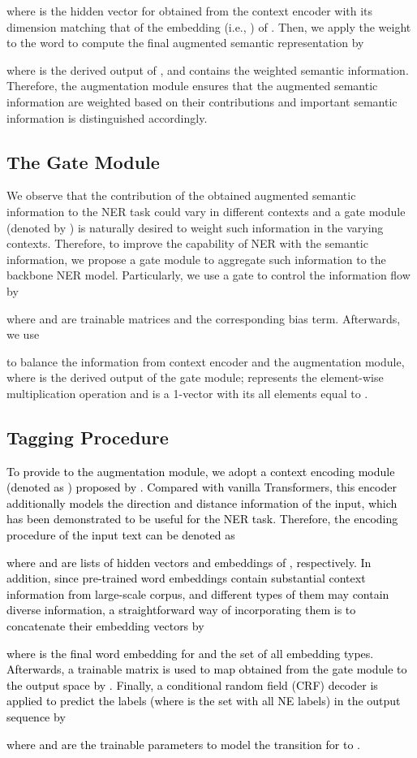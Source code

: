 \documentclass[11pt,a4paper]{article}
\begin{document}
where  is the hidden vector for  obtained from the context encoder with its dimension matching that of the embedding (i.e., ) of . 
Then, we apply the weight  to the word  to compute the final augmented semantic representation by

where  is the derived output of , and contains the weighted semantic information.
Therefore, the augmentation module ensures that the augmented semantic information are weighted based on their contributions and important semantic information is distinguished accordingly.





\subsection{The Gate Module}


We observe that the contribution of the obtained augmented semantic information to the NER task could vary in different contexts and
a gate module (denoted by ) is naturally desired to weight such information in the varying contexts.
Therefore, to improve the capability of NER with the semantic information, we propose a gate module to aggregate such information to the backbone NER model.
Particularly,
we use a  gate to control the information flow by

where  and  are trainable matrices and  the corresponding bias term.
Afterwards, we use

to balance the information from context encoder and the augmentation module, where  is the derived output of the gate module;
 represents the element-wise multiplication operation and  is a 1-vector with its all elements equal to .


\subsection{Tagging Procedure}


\textcolor{black}{
To provide  to the augmentation module, we adopt a context encoding module (denoted as ) proposed by \citet{DBLP:journals/corr/abs-1911-04474}.
Compared with vanilla Transformers, this encoder additionally models the direction and distance information of the input, which has been demonstrated to be useful for the NER task. 
Therefore, the encoding procedure of the input text can be denoted as

where  and  are lists of hidden vectors and embeddings of , respectively. 
In addition, since pre-trained word embeddings contain substantial context information from large-scale corpus, and different types of them may contain diverse information, a straightforward way of incorporating them is to concatenate their embedding vectors by

where  is the final word embedding for  and  the set of all embedding types.
Afterwards, a trainable matrix  is used to map  obtained from the gate module to the output space by .
Finally, a conditional random field (CRF) decoder is applied to predict the labels  (where  is the set with all NE labels) in the output sequence  by

where  and  are the trainable parameters to model the transition for  to .
}
\end{document}
